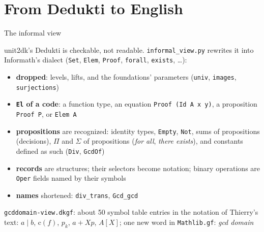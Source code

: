 \documentclass[10pt,aspectratio=169]{beamer}
\newcommand{\file}[1]{\texttt{#1}}
\begin{document}
\section{From Dedukti to English}

\begin{frame}{The informal view}

\small
unit2dk's Dedukti is checkable, not readable. \file{informal\_view.py}
rewrites it into Informath's dialect (\texttt{Set}, \texttt{Elem},
\texttt{Proof}, \texttt{forall}, \texttt{exists}, \ldots):

\begin{itemize}
\item \textbf{dropped}: levels, lifts, and the foundations' parameters
  (\texttt{univ}, \texttt{images}, \texttt{surjections})
\item \textbf{\texttt{El} of a code}: a function type, an equation
  \texttt{Proof (Id A x y)}, a proposition \texttt{Proof P}, or
  \texttt{Elem A}
\item \textbf{propositions} are recognized: identity types,
  \texttt{Empty}, \texttt{Not}, sums of propositions (decisions), $\Pi$ and
  $\Sigma$ of propositions (\emph{for all}, \emph{there exists}), and
  constants defined as such (\texttt{Div}, \texttt{GcdOf})
\item \textbf{records} are structures; their selectors become notation;
  binary operations are \texttt{Oper} fields named by their symbols
\item \textbf{names} shortened: \texttt{div\_trans},
  \texttt{Gcd\_gcd}
\end{itemize}

\file{gcddomain-view.dkgf}: about 50 symbol table entries in the
notation of Thierry's text: $a\mid b$, $\mathrm{c}(f)$, $p_k$,
$a + Xp$, $A[X]$; one new word in \file{Mathlib.gf}: \emph{gcd domain}

\end{frame}
\end{document}
